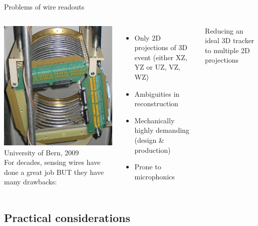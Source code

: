 \documentclass[]{beamer}
\newcommand*{\emphcol}{blue}
\begin{document}
\begin{frame}{Problems of wire readouts}
	\begin{columns}[c]
		\centering
		\includegraphics[width=\textwidth]{defence/mat_wires}\\
		{\tiny University of Bern, 2009}\\
		For decades, sensing wires have done a great job
		BUT they have many drawbacks:
		\begin{itemize}
			\item Only 2D projections of 3D event (either XZ, YZ or UZ, VZ, WZ)
			\item Ambiguities in reconstruction
			\item Mechanically highly demanding (design \& production)
			\item Prone to microphonics
		\end{itemize}
		{\color{\emphcol} Reducing an ideal 3D tracker to multiple 2D projections}
	\end{columns}
\end{frame}

\subsection{Practical considerations}
\end{document}
